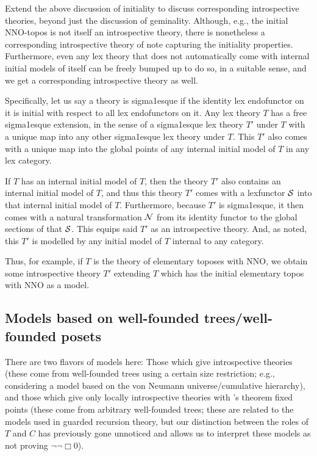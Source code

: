\begin{TODOblock}
Extend the above discussion of initiality to discuss corresponding introspective theories, beyond just the discussion of geminality. Although, e.g., the initial NNO-topos is not itself an introspective theory, there is nonetheless a corresponding introspective theory of note capturing the initiality properties. Furthermore, even any lex theory that does not automatically come with internal initial models of itself can be freely bumped up to do so, in a suitable sense, and we get a corresponding introspective theory as well.

Specifically, let us say a theory is sigma1esque if the identity lex endofunctor on it is initial with respect to all lex endofunctors on it. Any lex theory $T$ has a free sigma1esque extension, in the sense of a sigma1esque lex theory $T'$ under $T$ with a unique map into any other sigma1esque lex theory under $T$. This $T'$ also comes with a unique map into the global points of any internal initial model of $T$ in any lex category.

If $T$ has an internal initial model of $T$, then the theory $T'$ also contains an internal initial model of $T$, and thus this theory $T'$ comes with a lexfunctor $\mathcal{S}$ into that internal initial model of $T$. Furthermore, because $T'$ is sigma1esque, it then comes with a natural transformation $\mathcal{N}$ from its identity functor to the global sections of that $\mathcal{S}$. This equips said $T'$ as an introspective theory. And, as noted, this $T'$ is modelled by any initial model of $T$ internal to any category.

Thus, for example, if $T$ is the theory of elementary toposes with NNO, we obtain some introspective theory $T'$ extending $T$ which has the initial elementary topos with NNO as a model.
\end{TODOblock}

\subsection{Models based on well-founded trees/well-founded posets}
There are two flavors of models here: Those which give introspective theories (these come from well-founded trees using a certain size restriction; e.g., considering a model based on the von Neumann universe/cumulative hierarchy), and those which give only locally introspective theories with \Loeb's theorem fixed points (these come from arbitrary well-founded trees; these are related to the models used in guarded recursion theory, but our distinction between the roles of $T$ and $C$ has previously gone unnoticed and allows us to interpret these models as not proving $\lnot \lnot \Box 0$). \TODO

